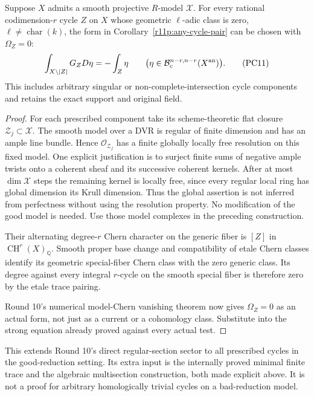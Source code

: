 \begin{corollary}
\label{r11p:good-reduction-G}
Suppose $X$ admits a smooth projective $R$-model $\mathcal X$.
For every rational codimension-$r$ cycle $Z$ on $X$ whose geometric
$\ell$-adic class is zero, $\ell\ne\operatorname{char}(k)$, the form
in Corollary~\ref{r11p:any-cycle-pair} can be chosen with
$\Omega_Z=0$:
\[
                  \int_{X\setminus|Z|}G_ZD\eta=-\int_Z\eta
       \qquad
       \bigl(\eta\in\mathcal B_c^{n-r,n-r}(X^{\rm an})\bigr).
\tag{PC11}\label{r11p:good-reduction-zero}
\]
This includes arbitrary singular or non-complete-intersection cycle
components and retains the exact support and original field.
\end{corollary}

\begin{proof}
For each prescribed component take its scheme-theoretic flat closure
$\mathcal Z_j\subset\mathcal X$.  The smooth model over a DVR is regular
of finite dimension and has an ample line bundle.  Hence
$\mathcal O_{\mathcal Z_j}$ has a finite globally locally free
resolution on this fixed model.  One explicit justification is to
surject finite sums of negative ample twists onto a coherent sheaf
and its successive coherent kernels.  After at most $\dim\mathcal X$
steps the remaining kernel is locally free, since every regular
local ring has global dimension its Krull dimension.  Thus the
global assertion is not inferred from perfectness without using the
resolution property.  No modification of the good model
is needed.  Use those model complexes in the preceding construction.

Their alternating degree-$r$ Chern character on the generic fiber
is $[Z]$ in $\operatorname{CH}^r(X)_{\mathbb Q}$.  Smooth proper
base change and compatibility of etale Chern classes identify its
geometric special-fiber Chern class with the zero generic class.
Its degree against every integral $r$-cycle on the smooth special
fiber is therefore zero by the etale trace pairing.

Round 10's numerical model-Chern vanishing theorem now gives
$\Omega_Z=0$ as an actual form, not just as a current or a
cohomology class.  Substitute into the strong equation already
proved against every actual test.
\end{proof}

This extends Round 10's direct regular-section sector to all prescribed
cycles in the good-reduction setting.  Its extra input is the
internally proved minimal finite trace and the algebraic multisection
construction, both made explicit above.  It is not a proof for
arbitrary homologically trivial cycles on a bad-reduction model.

